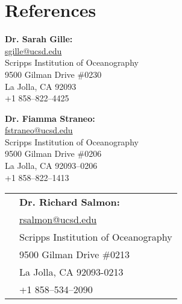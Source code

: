 \documentclass[10pt]{article}
\begin{document}
\vspace{.5cm}
\section*{References}
\vspace{.3cm}

\begin{minipage}[ht]{0.48\textwidth}
\begin{flushleft}
\textbf{Dr. Sarah Gille:} \\
\vspace{.1cm}
\url{sgille@ucsd.edu}\\
\vspace{.2cm}
\small{Scripps Institution of Oceanography}\\
\small{9500 Gilman Drive \#0230} \\
\small{La Jolla, CA 92093} \\
\small{+1 858--822--4425} 
\end{flushleft}
\end{minipage}
\hfill
\begin{minipage}[ht]{0.48\textwidth}
\begin{flushright}
\textbf{Dr. Fiamma Straneo:} \\
\vspace{.1cm}
\url{fstraneo@ucsd.edu}\\
\vspace{.2cm}
\small{Scripps Institution of Oceanography}\\
\small{9500 Gilman Drive \#0206} \\
\small{La Jolla, CA 92093--0206} \\
\small{+1 858--822--1413} 
\end{flushright}
\end{minipage}
\hfill
\begin{center}
\begin{minipage}[ht]{0.48\textwidth}
\vspace{.1cm}
\begin{center}
\begin{tabular}{l  l }
& \textbf{Dr. Richard Salmon:} \\[5pt]
& \url{rsalmon@ucsd.edu} \\[5pt]
&\small{Scripps Institution of Oceanography}\\
&\small{9500 Gilman Drive \#0213} \\
&\small{La Jolla, CA 92093-0213} \\
&\small{+1 858--534--2090} 
\end{tabular}
\end{center}
\end{minipage}
\end{center}
\end{document}
